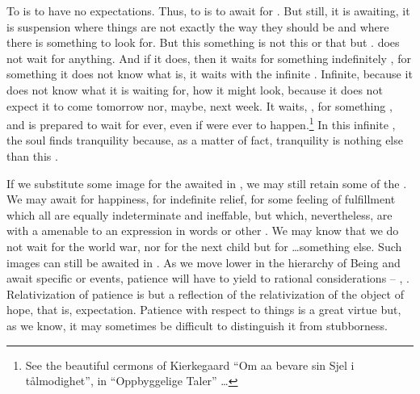 To  is to have no expectations. 
Thus, to  is to await for .  But still, it is
awaiting, it is suspension where things are not exactly the way they
should be and where there is something to look for.  But this
something is not this or that but .  does not 
wait for anything. And if it does, then it waits for something 
indefinitely , for something it does not know what is, 
it waits with the infinite . Infinite, because it does 
not know what it is waiting for, how it might look, because it does not 
expect it to come tomorrow nor, maybe, next week. It waits, 
, for something , and is prepared to wait 
for ever, even if  were ever to happen.\footnote{See the 
beautiful cermons of Kierkegaard ``Om aa bevare sin Sjel i 
t{\aa}lmodighet'', in ``Oppbyggelige Taler'' \ldots}
In this 
infinite , the soul finds tranquility because, as a 
matter of fact, tranquility is nothing else than this .

\subpa
If we substitute some image for the  awaited in 
, we may still retain some of the . We may 
await for  happiness, for indefinite relief, for some 
feeling of fulfillment which all are equally indeterminate and 
ineffable, but which, nevertheless, are  with a 
 amenable to an expression in words or other 
. We may know that we do not wait for the world war, nor 
for the next child but for \ldots something else. Such  
images can still be awaited in . As we move lower in the 
hierarchy of Being and await specific  or events, patience 
will have to yield to rational considerations -- , . Relativization of patience is but a reflection of the 
relativization of the object of hope, that is, expectation. Patience 
with respect to  things is a great virtue but, as we 
know, it may sometimes be difficult to distinguish it from stubborness. 

